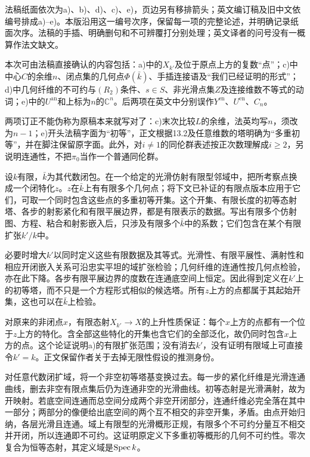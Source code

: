 
法稿纸面依次为a)、b)、d)、c)、e)，页边另有移排箭头；英文编订稿及旧中文依编号排成a)--e)。本版沿用这一编号次序，保留每一项的完整论述，并明确记录纸面次序。法稿的手插、明确删句和不可辨覆打分别处理；英文译者的问号没有一概算作法文缺文。

本次可由法稿直接确认的内容包括：a)中的$X_{k'}$及位于原点上方的复数“点”；c)中中心$C$的余维$n$、闭点集的几何点$\Phi(\bar k)$、手插连接语及“我们已经证明的形式”；d)中几何纤维的不可约与$(R_2)$条件、$s\in S$、非光滑点集$Z$及连接维数不等式的动词；e)中的$U^{\mathrm{an}}$和上标为$n$的$\mathbb C^n$。后两项在英文中分别误作$Y^{\mathrm{en}}$、$U^{\mathrm{en}}$、$C_n$。

两项订正不能伪称为原稿本来就写对了：c)末次比较$L$的余维，法英均写$n$，须改为$n-1$；e)开头法稿字面为“初等”，正文根据13.2及任意维数的塔明确为“多重初等”，并在脚注保留原字面。此外，对$i\ne1$的同伦群表述按正次数理解成$i\geq2$，另说明连通性，不把$\pi_0$当作一个普通同伦群。

设$k$有限，$\bar k$为其代数闭包。在一个给定的光滑仿射有限型邻域中，把所考察点换成一个闭特化$z$。$z$在$\bar k$上有有限多个几何点；将下文已补证的有限点版本应用于它们，可取一个同时包含这些点的多重初等开集。这个开集、有限长度的初等态射塔、各步的射影紧化和有限平展边界，都是有限表示的数据。写出有限多个仿射图、方程、粘合和射影嵌入后，只涉及有限多个$\bar k$中的系数；它们包含在某个有限扩张$k'/k$中。

必要时增大$k'$以同时定义这些有限数据及其等式。光滑性、有限平展性、满射性和相应开闭嵌入关系可沿忠实平坦的域扩张检验；几何纤维的连通性按几何点检验，亦在此下降。各步有限平展边界的度数在连通底空间上恒定。因此得到定义在$k'$上的初等塔，而不只是一个方程形式相似的候选塔。所有$z$上方的点都属于其起始开集，这也可以在$\bar k$上检验。

对原来的非闭点$x$，有限态射$X_{k'}\to X$的上升性质保证：每个$x$上方的点都有一个位于$z$上方的特化。含全部这些特化的开集也含它们的全部泛化，故仍同时包含$x$上方的点。这个论证说明a)的有限扩张范围；没有消去$k'$，没有证明有限域上可直接令$k'=k$。正文保留作者关于去掉无限性假设的推测身份。

对任意代数闭扩域，将一个非空初等塔基变换过去。每一步的紧化纤维是光滑连通曲线，删去非空有限点集后仍为连通非空的光滑曲线。初等态射是光滑满射，故为开映射。若底空间连通而总空间分成两个非空开闭部分，连通纤维必完全落在其中一部分；两部分的像便给出底空间的两个互不相交的非空开集，矛盾。由点开始归纳，各层光滑且连通。域上有限型的光滑概形正规，有限多个不可约分量互不相交并开闭，所以连通即不可约。这证明原定义下多重初等概形的几何不可约性。零次复合为恒等态射，其定义域是$\operatorname{Spec} k$。

